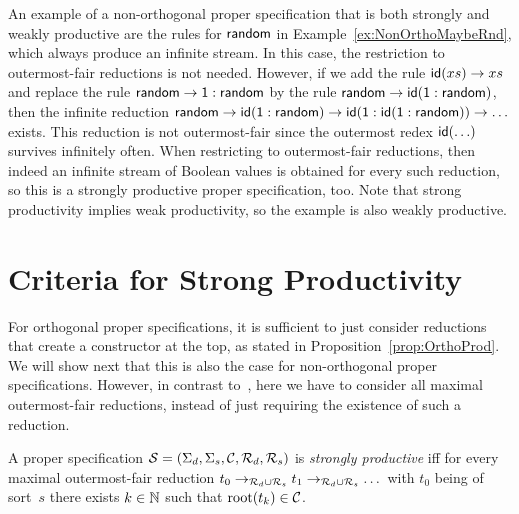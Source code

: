 \documentclass{eptcs}
\begin{document}
An example of a non-orthogonal proper specification that is both strongly and
weakly productive are the rules for $\mathsf{random}$ in
Example~\ref{ex:NonOrthoMaybeRnd}, which always produce an infinite stream.
In this case, the restriction to outermost-fair reductions is not needed.
However, if we add the rule $\mathsf{id}(xs) \to xs$ and replace the
rule $\mathsf{random} \to \mathsf{1} : \mathsf{random}$ by the rule
$\mathsf{random} \to \mathsf{id}(\mathsf{1} : \mathsf{random})$, then
the infinite reduction
$\mathsf{random} \to \mathsf{id}(\mathsf{1} : \mathsf{random}) \to
\mathsf{id}(\mathsf{1} : \mathsf{id}(\mathsf{1} : \mathsf{random})) \to \ldots$ exists. This
reduction is not outermost-fair since the outermost redex $\mathsf{id}(\ldots)$
survives infinitely often.
When restricting to outermost-fair reductions, then indeed an infinite stream of
Boolean values is obtained for every such reduction, so this is a strongly
productive proper specification, too.
Note that strong productivity implies weak productivity, so the example is also
weakly productive.



\section{Criteria for Strong Productivity}
\label{sec:Criteria}

For orthogonal proper specifications, it is sufficient to just consider
reductions that create a constructor at the top, as stated in
Proposition~\ref{prop:OrthoProd}. We will show next that this is also the case
for non-orthogonal proper specifications. However, in contrast to~\cite{ZR10},
here we have to consider all maximal outermost-fair reductions, instead of just
requiring the existence of such a reduction.

\begin{proposition}
\label{prop:NonOrthoProd}
A proper specification $\mathcal{S} = (\Sigma_d,\Sigma_s,\mathcal{C},\mathcal{R}_d,\mathcal{R}_s)$ is
\emph{strongly productive} iff for every maximal outermost-fair reduction
$t_0 \to_{\mathcal{R}_d \cup \mathcal{R}_s} t_1 \to_{\mathcal{R}_d \cup \mathcal{R}_s} \dots$
with $t_0$ being of sort~$s$ there exists $k \in \mathbb{N}$ such that
$\mathrm{root}(t_k) \in \mathcal{C}$.
\end{proposition}
\end{document}
